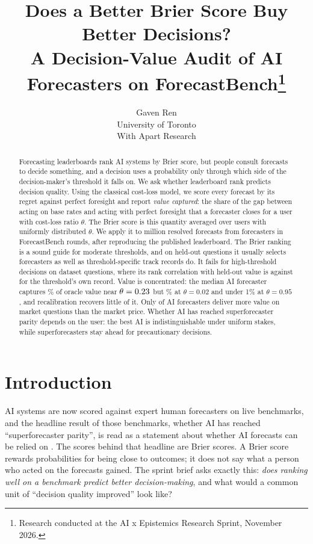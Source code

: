 \documentclass[10pt]{article}
\title{\vspace{-2.2em}\Large\bfseries Does a Better Brier Score Buy Better Decisions?\\[.2ex]
\large A Decision-Value Audit of AI Forecasters on ForecastBench\thanks{Research conducted at the AI x Epistemics Research Sprint, November 2026.}}
\author{Gaven Ren\\ \small University of Toronto\\ \small With Apart Research}
\date{}
\begin{document}
\maketitle
\vspace{-2.2em}

\begin{abstract}\noindent
Forecasting leaderboards rank AI systems by Brier score, but people consult forecasts to decide something, and a decision uses a probability only through which side of the decision-maker's threshold it falls on. We ask whether leaderboard rank predicts decision quality. Using the classical cost-loss model, we score every forecast by its regret against perfect foresight and report \emph{value captured}: the share of the gap between acting on base rates and acting with perfect foresight that a forecaster closes for a user with cost-loss ratio $\theta$. The Brier score is this quantity averaged over users with uniformly distributed $\theta$. We apply it to \nForecastsM{} million resolved forecasts from \nListed{} forecasters in \nRounds{} ForecastBench rounds, after reproducing the published leaderboard. The Brier ranking is a sound guide for moderate thresholds, and on held-out questions it usually selects forecasters as well as threshold-specific track records do. It fails for high-threshold decisions on dataset questions, where its rank correlation with held-out value is \rhoBNinety{} against \rhoONinety{} for the threshold's own record. Value is concentrated: the median AI forecaster captures \peakValue\% of oracle value near $\theta=0.23$ but \medAtLow\% at $\theta=0.02$ and under 1\% at $\theta=0.95$, and recalibration recovers little of it. Only \beatPriceCount{} of \nCand{} AI forecasters deliver more value on market questions than the market price. Whether AI has reached superforecaster parity depends on the user: the best AI is indistinguishable under uniform stakes, while superforecasters stay ahead for precautionary decisions.
\end{abstract}

\section{Introduction}
AI systems are now scored against expert human forecasters on live benchmarks, and the headline result of those benchmarks, whether AI has reached ``superforecaster parity'', is read as a statement about whether AI forecasts can be relied on \cite{karger2025,fri2026}. The scores behind that headline are Brier scores. A Brier score rewards probabilities for being close to outcomes; it does not say what a person who acted on the forecasts gained. The sprint brief asks exactly this: \emph{does ranking well on a benchmark predict better decision-making}, and what would a common unit of ``decision quality improved'' look like?
\end{document}
